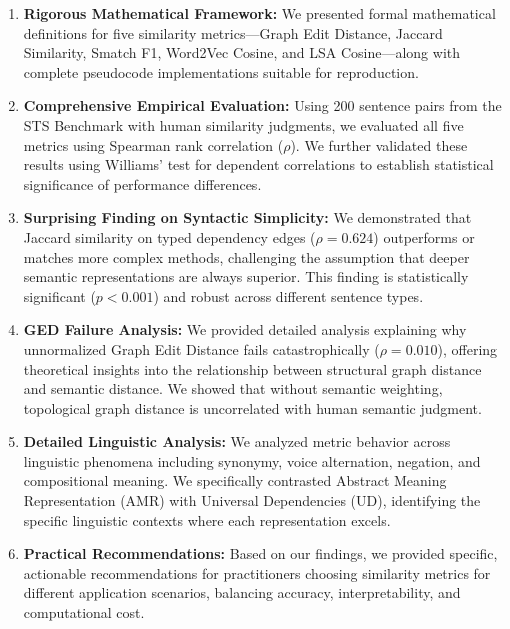 \documentclass[11pt,a4paper]{article}
\begin{document}
\begin{enumerate}
    \item \textbf{Rigorous Mathematical Framework:} We presented formal mathematical definitions for five similarity metrics---Graph Edit Distance, Jaccard Similarity, Smatch F1, Word2Vec Cosine, and LSA Cosine---along with complete pseudocode implementations suitable for reproduction.
    
    \item \textbf{Comprehensive Empirical Evaluation:} Using 200 sentence pairs from the STS Benchmark with human similarity judgments, we evaluated all five metrics using Spearman rank correlation ($\rho$). We further validated these results using Williams' test for dependent correlations to establish statistical significance of performance differences.
    
    \item \textbf{Surprising Finding on Syntactic Simplicity:} We demonstrated that Jaccard similarity on typed dependency edges ($\rho = 0.624$) outperforms or matches more complex methods, challenging the assumption that deeper semantic representations are always superior. This finding is statistically significant ($p < 0.001$) and robust across different sentence types.
    
    \item \textbf{GED Failure Analysis:} We provided detailed analysis explaining why unnormalized Graph Edit Distance fails catastrophically ($\rho = 0.010$), offering theoretical insights into the relationship between structural graph distance and semantic distance. We showed that without semantic weighting, topological graph distance is uncorrelated with human semantic judgment.
    
    \item \textbf{Detailed Linguistic Analysis:} We analyzed metric behavior across linguistic phenomena including synonymy, voice alternation, negation, and compositional meaning. We specifically contrasted Abstract Meaning Representation (AMR) with Universal Dependencies (UD), identifying the specific linguistic contexts where each representation excels.
    
    \item \textbf{Practical Recommendations:} Based on our findings, we provided specific, actionable recommendations for practitioners choosing similarity metrics for different application scenarios, balancing accuracy, interpretability, and computational cost.
\end{enumerate}
\end{document}
